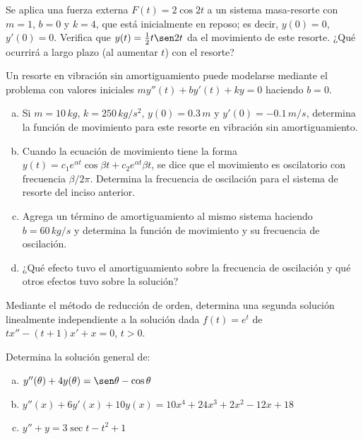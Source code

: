 \documentclass[12pt]{exam}
\begin{document}
    
    \begin{questions}
     \question%
     Se aplica una fuerza externa $F(t)=2\cos2t$ a un sistema masa-resorte con $m=1$, $b=0$ y $k=4$, que está inicialmente en reposo; es decir, $y(0)=0$, $y'(0)=0$. Verifica que $y(t)=\frac{1}{2}t\sen2t$ da el movimiento de este resorte. ¿Qué ocurrirá a largo plazo (al aumentar $t$) con el resorte?

     \question%
     Un resorte en vibración sin amortiguamiento puede modelarse mediante el problema con valores iniciales $my''(t)+by'(t)+ky=0$ haciendo $b=0$.
     \begin{enumerate}[a)]
         \item Si $m=10\, kg$, $k=250\,kg/s^2$, $y(0)=0.3\,m$ y $y'(0)=-0.1\,m/s$, determina la función de movimiento para este resorte en vibración sin amortiguamiento.
         \item Cuando la ecuación de movimiento tiene la forma $y(t)=c_1e^{\alpha t}\cos\beta t+c_2e^{\alpha t}\beta t$, se dice que el movimiento es oscilatorio con frecuencia $\beta/2\pi$. Determina la frecuencia de oscilación para el sistema de resorte del inciso anterior.
         \item Agrega un término de amortiguamiento al mismo sistema haciendo $b=60\,kg/s$ y determina la función de movimiento y su frecuencia de oscilación.
         \item ¿Qué efecto tuvo el amortiguamiento sobre la frecuencia de oscilación y qué otros efectos tuvo sobre la solución?
     \end{enumerate}

     \question%
    Mediante el método de reducción de orden, determina una segunda solución linealmente independiente a la solución dada $f(t)=e^t$ de $tx''-(t+1)x'+x=0$,  $t>0$.  

     \question%
     Determina la solución general de:
     \begin{enumerate}[a)]
        \item	$y''(\theta)+4y(\theta)=\sen\theta-\cos\theta$
        \item	$y''(x)+6y'(x)+10y(x)=10x^4+24x^3+2x^2-12x+18$
        \item $y''+y=3\sec t-t^2+1$
     \end{enumerate}


\end{questions}
\end{document}

